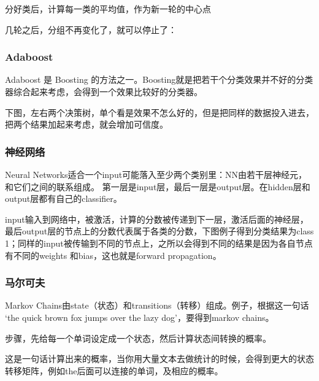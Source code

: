 分好类后，计算每一类的平均值，作为新一轮的中心点

几轮之后，分组不再变化了，就可以停止了：
\subsubsection{Adaboost}
Adaboost 是 Boosting 的方法之一。Boosting就是把若干个分类效果并不好的分类器综合起来考虑，会得到一个效果比较好的分类器。

下图，左右两个决策树，单个看是效果不怎么好的，但是把同样的数据投入进去，把两个结果加起来考虑，就会增加可信度。
\subsubsection{神经网络}
Neural Networks适合一个input可能落入至少两个类别里：NN由若干层神经元，和它们之间的联系组成。 第一层是input层，最后一层是output层。在hidden层和output层都有自己的classifier。

input输入到网络中，被激活，计算的分数被传递到下一层，激活后面的神经层，最后output层的节点上的分数代表属于各类的分数，下图例子得到分类结果为class 1；同样的input被传输到不同的节点上，之所以会得到不同的结果是因为各自节点有不同的weights 和bias，这也就是forward propagation。
\subsubsection{马尔可夫}

Markov Chains由state（状态）和transitions（转移）组成。例子，根据这一句话 ‘the quick brown fox jumps over the lazy dog’，要得到markov chains。

步骤，先给每一个单词设定成一个状态，然后计算状态间转换的概率。

这是一句话计算出来的概率，当你用大量文本去做统计的时候，会得到更大的状态转移矩阵，例如the后面可以连接的单词，及相应的概率。

